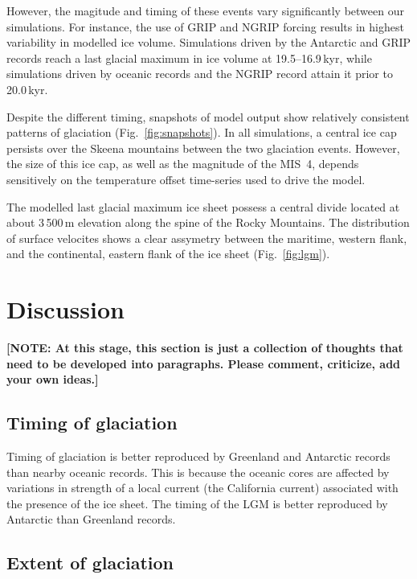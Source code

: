 \documentclass[tc, ms]{copernicus}
\newcommand{\note}[1]{\textbf{[NOTE: #1]}}
\begin{document}
However, the magitude and timing of these events vary significantly
between our simulations. For instance, the use of GRIP and NGRIP forcing
results in highest variability in modelled ice volume. Simulations driven by
the Antarctic and GRIP records reach a last glacial maximum in ice volume at
19.5--16.9\,\unit{kyr}, while simulations driven by oceanic records
and the NGRIP record attain it prior to 20.0\,\unit{kyr}.

Despite the different timing,
snapshots of model output show relatively consistent patterns of glaciation
(Fig.~\ref{fig:snapshots}). In all simulations, a central ice cap persists over
the Skeena mountains between the two glaciation events. However, the size of
this ice cap, as well as the magnitude of the MIS~4, depends sensitively on the temperature
offset time-series used to drive the model.

The modelled last glacial maximum ice sheet possess a central divide located at
about 3\,500\,\unit{m} elevation along the spine of the Rocky Mountains. The
distribution of surface velocites shows a clear assymetry between the maritime,
western flank, and the continental, eastern flank of the ice sheet
(Fig.~\ref{fig:lgm}).

\section{Discussion}
\label{sec:discussion}

\note{At this stage, this section is just a collection of thoughts that need to
be developed into paragraphs. Please comment, criticize, add your own ideas.}

\subsection{Timing of glaciation}

Timing of glaciation is better reproduced by Greenland and Antarctic records than
nearby oceanic records. This is because the oceanic cores are affected by
variations in strength of a local current (the California current) associated
with the presence of the ice sheet. The timing of the LGM is better reproduced
by Antarctic than Greenland records.

\subsection{Extent of glaciation}
\end{document}
